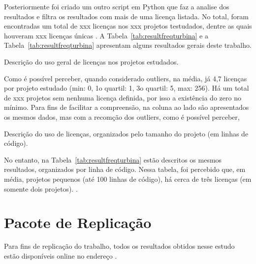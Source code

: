 Posteriormente foi criado um outro script em Python que faz a analise dos resultados e filtra os resultados com mais de uma licença listada. No total, foram encontradas um total de xxx licenças nos xxx projetos testudados, dentre as quais houveram xxx licenças únicas .
A Tabela~\ref{tab:resultfreqturbina} e a Tabela~\ref{tab:resultfreqturbina} apresentam alguns resultados gerais deste trabalho.


\begin{table}[h]
	\centering
	\caption{Descrição do uso geral de licenças nos projetos estudados.}
	\label{tab:resultfreqturbina}	
	
\end{table}


Como é possível perceber, quando considerado outliers, na média, já 4,7 licenças por projeto estudado (min: 0, 1o quartil: 1, 3o quartil: 5, max: 256). Há um total de xxx projetos sem nenhuma licença definida, por isso a existência do zero no mínimo. Para fins de facilitar a compreensão, na coluna ao lado são apresentados os mesmos dados, mas com a recomção dos outliers, como é possível perceber, 


\begin{table}[h]
	\centering
	\caption{Descrição do uso de licenças, organizados pelo tamanho do projeto (em linhas de código).}
	\label{tab:resultfreqturbina}	
	
\end{table}

No entanto, na Tabela~\ref{tab:resultfreqturbina} estão descritos os mesmos resultados, organizados por linha de código. Nessa tabela, foi percebido que, em média, projetos pequenos (até 100 linhas de código), há cerca de três licenças (em somente dois projetos). .

\section{Pacote de Replicação}

Para fins de replicação do trabalho, todos os resultados obtidos nesse estudo estão disponíveis online no endereço . 